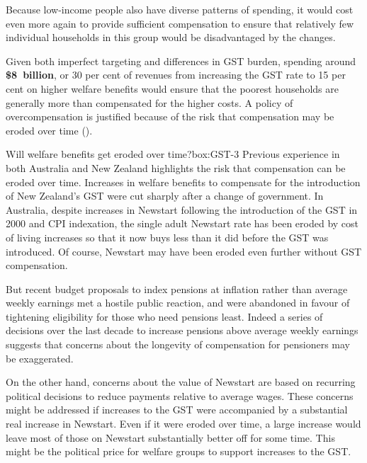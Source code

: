 Because low-income people also have diverse patterns of spending, it would cost even more again to provide sufficient compensation to ensure that relatively few individual households in this group would be disadvantaged by the changes. 

Given both imperfect targeting and differences in GST burden, spending around \textbf{\$8~billion}, or 30 per cent of revenues from increasing the GST rate to 15 per cent  on higher welfare benefits would ensure that the poorest households are generally more than compensated for the higher costs. A policy of overcompensation is justified because of the risk that compensation may be eroded over time ().

\begin{smallbox}{Will welfare benefits get eroded over time?}{box:GST-3}
Previous experience in both Australia and New Zealand highlights the risk that compensation can be eroded over time. Increases in welfare benefits to compensate for the introduction of New Zealand’s GST were cut sharply after a change of government. In Australia, despite increases in Newstart following the introduction of the GST in 2000 and CPI indexation, the single adult Newstart rate has been eroded by cost of living increases so that it now buys less than it did before the GST was introduced.  Of course, Newstart may have been eroded even further without GST compensation.

But recent budget proposals to index pensions at inflation rather than average weekly earnings met a hostile public reaction, and were abandoned in favour of tightening eligibility for those who need pensions least.  Indeed a series of decisions over the last decade to increase pensions above average weekly earnings  suggests that concerns about the longevity of compensation for pensioners may be exaggerated.

On the other hand, concerns about the value of Newstart are based on recurring political decisions to reduce payments relative to average wages. These concerns might be addressed if increases to the GST were accompanied by a substantial real increase in Newstart. Even if it were eroded over time, a large increase would leave most of those on Newstart substantially better off for some time. This might be the political price for welfare groups to support increases to the GST. 

\end{smallbox}

